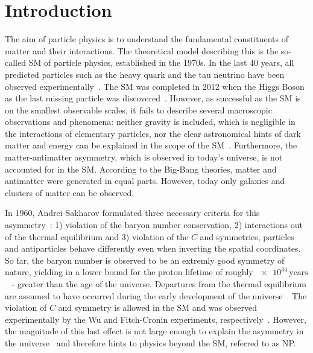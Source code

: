 \chapter{Introduction}

\linespread{1.08}\selectfont

The aim of particle physics is to understand the fundamental constituents of matter and their interactions.
The theoretical model describing this is the so-called \ac{SM} of particle physics, established in the \num{1970}s.
In the last \num{40} years, all predicted particles such as the heavy \tquark quark and the tau neutrino have been observed experimentally~\cite{Abachi:1994td,Abe:1995hr,Kodama:2000mp}.
The \ac{SM} was completed in \num{2012} when the Higgs Boson as the last missing particle was discovered~\cite{Chatrchyan:2012xdj, Aad:2012tfa}.
However, as successful as the \ac{SM} is on the smallest observable scales, it fails to describe several macroscopic observations and phenomena:
neither gravity is included, which is negligible in the interactions of elementary particles, nor the clear astronomical hints of dark matter and energy can be explained in the scope of the \ac{SM}~\cite{Corbelli:1999af,Kowalski:2008ez}.
Furthermore, the matter-antimatter asymmetry, which is observed in today's universe, is not accounted for in the \ac{SM}.
According to the Big-Bang theories, matter and antimatter were generated in equal parts.
However, today only galaxies and clusters of matter can be observed.

In \num{1960}, Andrei Sakharov formulated three necessary criteria for this asymmetry~\cite{Sakharov:1967dj}: 1) violation of the baryon number conservation, 2) interactions out of the thermal equilibrium and 3) violation of the $C$ and \CP symmetries, \ie particles and antiparticles behave differently even when inverting the spatial coordinates.
So far, the baryon number is observed to be an extremly good symmetry of nature, yielding in a lower bound for the proton lifetime of roughly $\num{e34}\,\text{years}$~\cite{Nishino:2009aa} - greater than the age of the universe.
Departures from the thermal equilibrium are assumed to have occurred during the early development of the universe~\cite{Kolb:1990vq}.
The violation of $C$ and \CP symmetry is allowed in the \ac{SM} and was observed experimentally by the Wu and Fitch-Cronin experiments, respectively~\cite{Wu:1957my, Christenson:1964fg}.
However, the magnitude of this last effect is not large enough to explain the asymmetry in the universe~\cite{Gavela:1993ts} and therefore hints to physics beyond the \ac{SM}, referred to as \ac{NP}.

